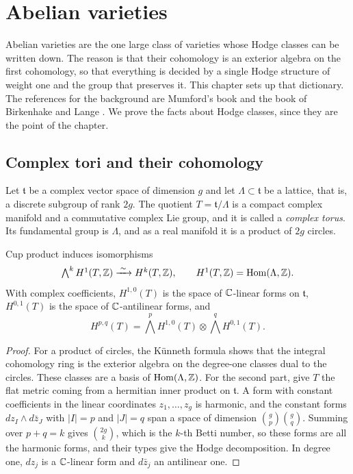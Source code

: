 \chapter{Abelian varieties}\label{ch:abelian}

Abelian varieties are the one large class of varieties whose Hodge classes
can be written down. The reason is that their cohomology is an exterior
algebra on the first cohomology, so that everything is decided by a single
Hodge structure of weight one and the group that preserves it. This
chapter sets up that dictionary. The references for the background are
Mumford's book \cite{Mum70} and the book of Birkenhake and Lange
\cite{BL04}. We prove the facts about Hodge classes, since they are the
point of the chapter.

\section{Complex tori and their cohomology}

Let $\mathfrak{t}$ be a complex vector space of dimension $g$ and let $\Lambda\subset
\mathfrak{t}$ be a lattice, that is, a discrete subgroup of rank $2g$. The quotient
$T=\mathfrak{t}/\Lambda$ is a compact complex manifold and a commutative complex Lie
group, and it is called a \emph{complex torus}. Its fundamental group is
$\Lambda$, and as a real manifold it is a product of $2g$ circles.

\begin{proposition}\label{prop:torcoh}
Cup product induces isomorphisms
\[
  \textstyle\bigwedge^{k}H^{1}(T,\mathbb{Z})\xrightarrow{\;\sim\;}H^{k}(T,\mathbb{Z}),
  \qquad H^{1}(T,\mathbb{Z})=\operatorname{Hom}(\Lambda,\mathbb{Z}).
\]
With complex coefficients, $H^{1,0}(T)$ is the space of $\mathbb{C}$-linear forms
on $\mathfrak{t}$, $H^{0,1}(T)$ is the space of $\mathbb{C}$-antilinear forms, and
\[
  H^{p,q}(T)=\textstyle\bigwedge^{p}H^{1,0}(T)\otimes\bigwedge^{q}H^{0,1}(T).
\]
\end{proposition}

\begin{proof}
For a product of circles, the K\"unneth formula shows that the integral
cohomology ring is the exterior algebra on the degree-one classes dual to
the circles. These classes are a basis of $\operatorname{Hom}(\Lambda,\mathbb{Z})$. For the
second part, give $T$ the flat metric coming from a hermitian inner
product on $\mathfrak{t}$. A form with constant coefficients in the linear coordinates
$z_{1},\dots,z_{g}$ is harmonic, and the constant forms
$dz_{I}\wedge d\bar z_{J}$ with $|I|=p$ and $|J|=q$ span a space of
dimension $\binom{g}{p}\binom{g}{q}$. Summing over $p+q=k$ gives
$\binom{2g}{k}$, which is the $k$-th Betti number, so these forms are all
the harmonic forms, and their types give the Hodge decomposition. In degree
one, $dz_{j}$ is a $\mathbb{C}$-linear form and $d\bar z_{j}$ an antilinear one.
\end{proof}

